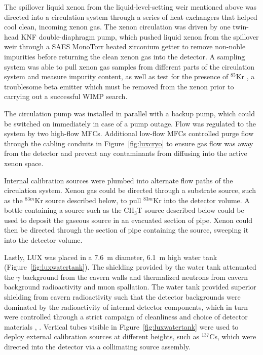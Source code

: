 The spillover liquid xenon from the liquid-level-setting weir mentioned above was directed into a circulation system through a series of heat exchangers that helped cool clean, incoming xenon gas. The xenon circulation was driven by one twin-head KNF double-diaphragm pump, which pushed liquid xenon from the spillover weir through a SAES MonoTorr heated zirconium getter to remove non-noble impurities before returning the clean xenon gas into the detector. A sampling system was able to pull xenon gas samples from different parts of the circulation system and measure impurity content, as well as test for the presence of $^{85}$Kr \cite{Dobi2011}, a troublesome beta emitter which must be removed from the xenon prior to carrying out a successful \ac{WIMP} search.

The circulation pump was installed in parallel with a backup pump, which could be switched on immediately in case of a pump outage. Flow was regulated to the system by two high-flow \ac{MFC}s. Additional low-flow \ac{MFC}s controlled purge flow through the cabling conduits in Figure~\ref{fig:luxcryo} to ensure gas flow was away from the detector and prevent any contaminants from diffusing into the active xenon space.

Internal calibration sources were plumbed into alternate flow paths of the circulation system. Xenon gas could be directed through a substrate source, such as the $^{83m}$Kr source described below, to pull $^{83m}$Kr into the detector volume. A bottle containing a source such as the CH$_{3}$T source described below could be used to deposit the gaseous source in an evacuated section of pipe. Xenon could then be directed through the section of pipe containing the source, sweeping it into the detector volume. 

Lastly, \ac{LUX} was placed in a 7.6~m diameter, 6.1~m high water tank (Figure~\ref{fig:luxwatertank}). The shielding provided by the water tank attenuated the $\gamma$ background from the cavern walls and thermalized neutrons from cavern background radioactivity and muon spallation. The water tank provided superior shielding from cavern radioactivity such that the detector backgrounds were dominated by the radioactivity of internal detector components, which in turn were controlled through a strict campaign of cleanliness and choice of detector materials \cite{LUXDetectorPaper}, \cite{LUXRun03Backgrounds}. Vertical tubes visible in Figure~\ref{fig:luxwatertank} were used to deploy external calibration sources at different heights, such as $^{137}$Cs, which were directed into the detector via a collimating source assembly.


